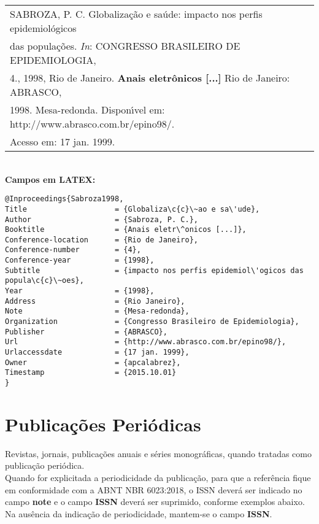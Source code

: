 \begin{tabular}{|l|c|} \hline
	SABROZA, P. C. Globaliza\c{c}\~ao e sa\'ude: impacto nos perfis
	epidemiol\'ogicos \\das popula\c{c}\~oes. \textit{In}: CONGRESSO BRASILEIRO DE
	EPIDEMIOLOGIA,\\4., 1998, Rio de Janeiro. \textbf{Anais eletr\^onicos [...]} Rio de
	Janeiro: ABRASCO,\\1998. Mesa-redonda. Dispon\'{\i}vel em:
	http://www.abrasco.com.br/epino98/.\\ Acesso em: 17 jan. 1999.\\\hline 
\end{tabular} \\

\textbf{Campos em LATEX:} 

\begin{verbatim}
@Inproceedings{Sabroza1998,
Title                    = {Globaliza\c{c}\~ao e sa\'ude},
Author                   = {Sabroza, P. C.},
Booktitle                = {Anais eletr\^onicos [...]},
Conference-location      = {Rio de Janeiro},
Conference-number        = {4},
Conference-year          = {1998},
Subtitle                 = {impacto nos perfis epidemiol\'ogicos das 
popula\c{c}\~oes},
Year                     = {1998},
Address                  = {Rio Janeiro},
Note                     = {Mesa-redonda},
Organization             = {Congresso Brasileiro de Epidemiologia},
Publisher                = {ABRASCO},
Url                      = {http://www.abrasco.com.br/epino98/},
Urlaccessdate            = {17 jan. 1999},
Owner                    = {apcalabrez},
Timestamp                = {2015.10.01}
}
\end{verbatim}

\section{Publica\c{c}\~oes Peri\'odicas}

Revistas, jornais, publica\c{c}\~oes anuais e s\'eries monogr\'aficas, quando
tratadas como publica\c{c}\~ao peri\'odica. \\

Quando for explicitada a periodicidade da publica\c{c}\~ao, para que a refer\^encia fique em conformidade com a ABNT NBR 6023:2018, o ISSN dever\'a ser indicado no campo \textbf{note} e o campo \textbf{ISSN} dever\'a ser suprimido, conforme exemplos abaixo. Na aus\^encia da indica\c{c}\~ao de periodicidade, mantem-se o campo \textbf{ISSN}. \\

